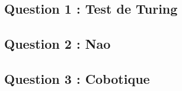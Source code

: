\subsection{Question 1 : Test de Turing}


\subsection{Question 2 : Nao}

\subsection{Question 3 : Cobotique}
